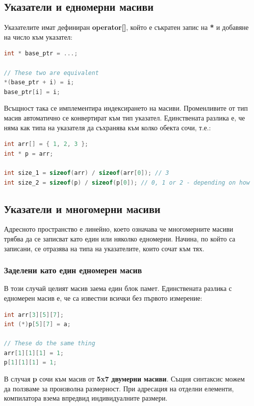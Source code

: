 \documentclass[fleqn,12pt]{article}
\begin{document}
\subsection{Указатели и едномерни масиви}

Указателите имат дефиниран \textbf{operator[]}, който е съкратен запис на \textbf{*} и добавяне на число към указател:
\begin{lstlisting}[language=C++, caption=Pointer example 3]
int * base_ptr = ...;

// These two are equivalent
*(base_ptr + i) = i;
base_ptr[i] = i;
\end{lstlisting}

Всъщност така се имплементира индексирането на масиви. Променливите от тип масив автоматично се конвертират към тип указател.
Единствената разлика е, че няма как типа на указателя да съхранява към колко обекта сочи, т.е.:

\begin{lstlisting}[language=C++, caption=Pointer example 3]
int arr[] = { 1, 2, 3 };
int * p = arr;

int size_1 = sizeof(arr) / sizeof(arr[0]); // 3
int size_2 = sizeof(p) / sizeof(p[0]); // 0, 1 or 2 - depending on how big the pointer is wrt to the int type
\end{lstlisting}

\subsection{Указатели и многомерни масиви}
Адресното пространство е линейно, което означава че многомерните масиви трябва да се записват като един или няколко едномерни.
Начина, по който са записани, се отразява на типа на указателите, които сочат към тях.

\subsubsection{Заделени като един едномерен масив}
В този случай целият масив заема един блок памет. Единствената разлика с едномерен масив е, че са известни всички без първото измерение:
\begin{lstlisting}[language=C++, caption=Multidimensional pointers]
int arr[3][5][7];
int (*)p[5][7] = a;

// These do the same thing
arr[1][1][1] = 1;
p[1][1][1] = 1;
\end{lstlisting}

В случая \textbf{p} сочи към масив от \textbf{5x7 двумерни масиви}. Същия синтаксис можем да ползваме за произволна размерност.
При адресация на отделни елементи, компилатора взема впредвид индивидуалните размери.
\end{document}
